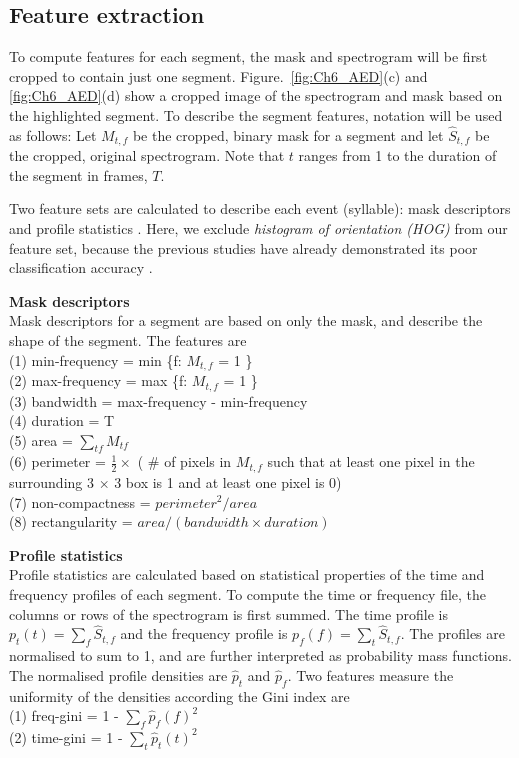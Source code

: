 \subsection{Feature extraction}
To compute features for each segment, the mask and spectrogram will be first cropped to contain just one segment. Figure.~\ref{fig:Ch6_AED}(c) and \ref{fig:Ch6_AED}(d) show a cropped image of the spectrogram and mask based on the highlighted segment.
To describe the segment features, notation will be used as follows:
Let $M_{t,f}$ be the cropped, binary mask for a segment and let $\hat{S}_{t,f}$ be the cropped, original spectrogram. Note that $t$ ranges from 1 to the duration of the segment in frames, $T$.



Two feature sets are calculated to describe each event (syllable): mask descriptors and profile statistics \citep{briggs2012acoustic}. Here, we exclude \textit{histogram of orientation (HOG)} from our feature set, because the previous studies have already demonstrated its poor classification accuracy \citep{briggs2012acoustic, ruizmultiple2015}. 

\noindent \textbf{Mask descriptors}
\\
Mask descriptors for a segment are based on only the mask, and describe the shape of the segment. The features are
\\
\noindent (1) min-frequency = min \{f: $M_{t,f}$ = 1 \} 
\\
\noindent (2) max-frequency = max \{f: $M_{t,f}$ = 1 \}
\\
\noindent (3) bandwidth = max-frequency - min-frequency
\\
\noindent (4) duration = T
\\
\noindent (5) area = $\sum_{tf}M_{tf}$
\\
\noindent (6) perimeter = $\frac{1}{2} \times $ ( $\#$ of pixels in $M_{t,f}$ such that at least one pixel in the surrounding 3 $\times$ 3 box is 1 and at least one pixel is 0)
\\
\noindent (7) non-compactness = $perimeter^{2}/area$
\\
\noindent (8) rectangularity = $area/(bandwidth \times duration)$



\noindent \textbf{Profile statistics}
\\
Profile statistics are calculated based on statistical properties of the time and frequency profiles of each segment. 
To compute the time or frequency file, the columns or rows of the spectrogram is first summed.
The time profile is $p_{t}(t) = \sum_{f}\hat{S}_{t,f}$ and the frequency profile is $p_{f}(f) = \sum_{t}\hat{S}_{t,f}$. The profiles are normalised to sum to 1, and are further interpreted as probability mass functions. The normalised profile densities are $\hat{p}_{t}$ and $\hat{p}_{f}$.
Two features measure the uniformity of the densities according the Gini index are
\\
(1) freq-gini = 1 - $\sum_{f}\hat{p}_{f}(f)^{2}$
\\
(2) time-gini = 1 - $\sum_{t}\hat{p}_{t}(t)^{2}$

